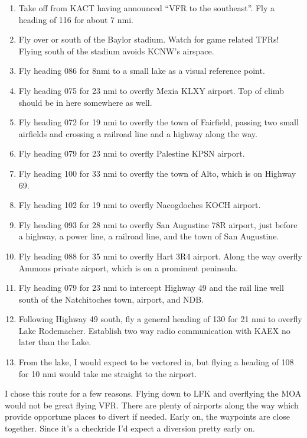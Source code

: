 \begin{enumerate}
    \item Take off from KACT having announced ``VFR to the southeast''. Fly a heading of 116 for about 7 nmi.
    \item Fly over or south of the Baylor stadium. Watch for game related TFRs! Flying south of the stadium avoids KCNW's airspace.
    \item Fly heading 086 for 8nmi to a small lake as a visual reference point.
    \item Fly heading 075 for 23 nmi to overfly Mexia KLXY airport. Top of climb should be in here somewhere as well.
    \item Fly heading 072 for 19 nmi to overfly the town of Fairfield, passing two small airfields and crossing a railroad line and a highway along the way.
    \item Fly heading 079 for 23 nmi to overfly Palestine KPSN airport.
    \item Fly heading 100 for 33 nmi to overfly the town of Alto, which is on Highway 69.
    \item Fly heading 102 for 19 nmi to overfly Nacogdoches KOCH airport.
    \item Fly heading 093 for 28 nmi to overfly San Augustine 78R airport, just before a highway, a power line, a railroad line, and the town of San Augustine.
    \item Fly heading 088 for 35 nmi to overfly Hart 3R4 airport. Along the way overfly Ammons private airport, which is on a prominent peninsula.
    \item Fly heading 079 for 23 nmi to intercept Highway 49 and the rail line well south of the Natchitoches town, airport, and NDB.
    \item Following Highway 49 south, fly a general heading of 130 for 21 nmi to overfly Lake Rodemacher. Establish two way radio communication with KAEX no later than the Lake.
    \item From the lake, I would expect to be vectored in, but flying a heading of 108 for 10 nmi would take me straight to the airport.
\end{enumerate}

I chose this route for a few reasons. Flying down to LFK and overflying the MOA would not be great flying VFR. There are plenty of airports along the way which provide opportune places to divert if needed. Early on, the waypoints are close together. Since it's a checkride I'd expect a diversion pretty early on.

